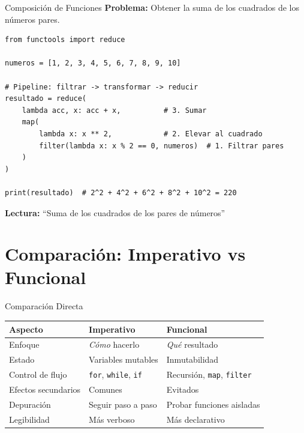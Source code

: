 \documentclass[aspectratio=169]{beamer}
\begin{document}
\begin{frame}[fragile]{Composición de Funciones}
    \textbf{Problema:} Obtener la suma de los cuadrados de los números pares.
    \vspace{0.3cm}
    
    \begin{lstlisting}[title=Pipeline Funcional]
from functools import reduce

numeros = [1, 2, 3, 4, 5, 6, 7, 8, 9, 10]

# Pipeline: filtrar -> transformar -> reducir
resultado = reduce(
    lambda acc, x: acc + x,          # 3. Sumar
    map(
        lambda x: x ** 2,            # 2. Elevar al cuadrado
        filter(lambda x: x % 2 == 0, numeros)  # 1. Filtrar pares
    )
)

print(resultado)  # 2^2 + 4^2 + 6^2 + 8^2 + 10^2 = 220
    \end{lstlisting}
    
    \vspace{0.2cm}
    \textbf{Lectura:} ``Suma de los cuadrados de los pares de números''
\end{frame}

\section{Comparación: Imperativo vs Funcional}

\begin{frame}{Comparación Directa}
    \begin{table}[]
        \centering
        \renewcommand{\arraystretch}{1.4}
        \begin{tabular}{p{4cm} p{5cm} p{5cm}}
            \toprule
            \textbf{Aspecto} & \textbf{Imperativo} & \textbf{Funcional} \\
            \midrule
            Enfoque & \textit{Cómo} hacerlo & \textit{Qué} resultado \\
            Estado & Variables mutables & Inmutabilidad \\
            Control de flujo & \texttt{for}, \texttt{while}, \texttt{if} & Recursión, \texttt{map}, \texttt{filter} \\
            Efectos secundarios & Comunes & Evitados \\
            Depuración & Seguir paso a paso & Probar funciones aisladas \\
            Legibilidad & Más verboso & Más declarativo \\
            \bottomrule
        \end{tabular}
    \end{table}
\end{frame}
\end{document}
